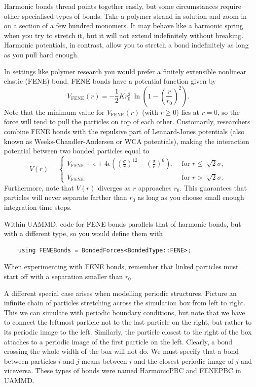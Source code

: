 Harmonic bonds thread points together easily, but some circumstances require
other specialised types of bonds. Take a polymer strand in solution and zoom in
on a section of a few hundred monomers. It may behave like a harmonic spring
when you try to stretch it, but it will not extend indefinitely without
breaking. Harmonic potentials, in contrast, allow you to stretch a bond
indefinitely as long as you pull hard enough.

In settings like polymer research you would prefer a finitely extensible
nonlinear  elastic (FENE) bond. FENE bonds have a potential function given by
\begin{equation*}
  V_\text{FENE}(r) = -\frac{1}{2} K r_0^2\ 
                \ln\left(1 - \left(\frac{r}{r_0}\right)^2\right).
\end{equation*}
Note that the minimum value for $V_\text{FENE}(r)$ (with $r \geq 0$) lies at $r 
= 0$, so the force will tend to pull the particles on top of each other. 
Customarily, researchers combine FENE bonds with the repulsive part of 
Lennard-Jones potentials (also known as Weeks-Chandler-Andersen or WCA 
potentials), making the interaction potential between two bonded particles equal 
to
\begin{equation*}
  V(r) =
    \begin{cases}
         V_\text{FENE}
         + \epsilon
         + 4\epsilon\left(\left(\frac{\sigma}{r}\right)^{12}
                        - \left(\frac{\sigma}{r}\right)^6\right),
         & \text{ for } r \leq \sqrt[6]{2} \sigma, \\
         V_\text{FENE}
         & \text{ for } r > \sqrt[6]{2} \sigma.
    \end{cases}
\end{equation*}
Furthermore, note that $V(r)$ diverges as $r$ approaches $r_0$. This guarantees
that particles will never separate farther than $r_0$ as long as you choose
small enough integration time steps.

Within UAMMD, code for FENE bonds parallels that of harmonic bonds, but with a
different type, so you would define them with
\begin{lstlisting}
    using FENEBonds = BondedForces<BondedType::FENE>;
\end{lstlisting}
When experimenting with FENE bonds, remember that linked particles must start
off with a separation smaller than $r_0$.

A different special case arises when modelling periodic structures. Picture an
infinite chain of particles stretching across the simulation box from left to
right. This we can simulate with periodic boundary conditions, but note that we
have to connect the leftmost particle not to the last particle on the right, but
rather to its periodic image to the left. Similarly, the particle closest to the
right of the box attaches to a periodic image of the first particle on the left.
Clearly, a bond crossing the whole width of the box will not do. We must specify
that a bond between particles $i$ and $j$ means between $i$ and the closest
periodic image of $j$ and viceversa. These types of bonds were named HarmonicPBC
and FENEPBC in UAMMD.


